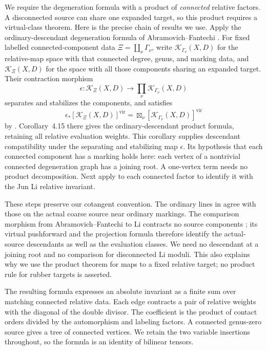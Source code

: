 We require the degeneration formula with a product of \emph{connected}
relative factors.  A disconnected source can share one expanded target,
so this product requires a virtual-class theorem.  Here is the precise
chain of results we use.  Apply the ordinary-descendant degeneration formula
of Abramovich--Fantechi \cite[Theorem~0.1 and Section~5]{AF16}.
For fixed labelled connected-component data
$\Xi=\coprod_\nu\Gamma_\nu$, write $\mathcal K_{\Gamma_\nu}(X,D)$ for
the relative-map space with that connected degree, genus, and marking data,
and $\mathcal K_\Xi(X,D)$ for the space with all those components sharing
an expanded target.  Their contraction morphism
\[
 \epsilon:\mathcal K_\Xi(X,D)\longrightarrow
              \prod_\nu\mathcal K_{\Gamma_\nu}(X,D)
\]
separates and stabilizes the components, and satisfies
\[
 \epsilon_*[\mathcal K_\Xi(X,D)]^{\mathrm{vir}}
      =\boxtimes_\nu[\mathcal K_{\Gamma_\nu}(X,D)]^{\mathrm{vir}}
\]
by \cite[Proposition~4.14]{AF16}.  Corollary~4.15 there gives the
ordinary-descendant product formula, retaining all relative evaluation
weights.  This corollary supplies descendant compatibility under the
separating and stabilizing map $\epsilon$.
Its hypothesis that each connected component has a marking
holds here: each vertex of a nontrivial connected degeneration graph has
a joining root.  A one-vertex term needs no product decomposition.
Next apply \cite[Theorem~1.1.2]{AMW14} to each connected factor to identify
it with the Jun Li relative invariant.

These steps preserve our cotangent convention.  The ordinary lines in
\cite[Definition~4.1 and Section~4.3]{AF16} agree with those on the actual
coarse source near ordinary markings.  The comparison morphism from
Abramovich--Fantechi to Li contracts no source components
\cite[Section~4.1]{AMW14}; its virtual pushforward and the projection
formula therefore identify the actual-source descendants as well as the
evaluation classes.  We need no descendant at a joining root and no
comparison for disconnected Li moduli.  This also explains why we use the
product theorem for maps to a fixed relative target; no product rule for
rubber targets is asserted.

The resulting formula expresses an absolute invariant as a finite sum
over matching connected relative data.  Each edge contracts a pair of
relative weights with the diagonal of the double divisor.  The coefficient
is the product of contact orders divided by the automorphism and labeling
factors.  A connected genus-zero source gives a tree of connected vertices.
We retain the two variable insertions throughout, so the formula is an
identity of bilinear tensors.

